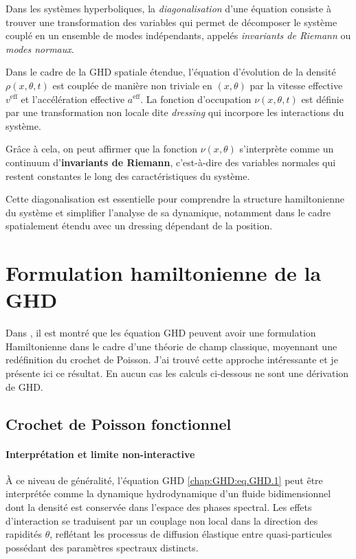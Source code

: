 \medskip

Dans les systèmes hyperboliques, la \emph{diagonalisation} d'une équation consiste à trouver une transformation des variables qui permet de décomposer le système couplé en un ensemble de modes indépendants, appelés \emph{invariants de Riemann} ou \emph{modes normaux}. 

\medskip

Dans le cadre de la \gls{GHD} spatiale étendue, l'équation d'évolution de la densité \(\rho(x,\theta,t)\) est couplée de manière non triviale en \((x,\theta)\) par la vitesse effective \(v^{\mathrm{eff}}\) et l'accélération effective \(a^{\mathrm{eff}}\). La fonction d'occupation \(\nu(x,\theta,t)\) est définie par une transformation non locale dite \emph{dressing} qui incorpore les interactions du système.

\medskip

Grâce à cela, on peut affirmer que la fonction $\nu (x , \theta)$  s’interprète comme un continuum d’{\bf invariants de Riemann}, c’est-à-dire des variables normales qui restent constantes le long des caractéristiques du système.

\medskip

Cette diagonalisation est essentielle pour comprendre la structure hamiltonienne du système et simplifier l'analyse de sa dynamique, notamment dans le cadre spatialement étendu avec un dressing dépendant de la position. 

\section{Formulation hamiltonienne de la GHD}

Dans  \cite{bonnemain2024hamiltonian}, il est montré que les équation \gls{GHD} peuvent
avoir une formulation Hamiltonienne dans le cadre d'une théorie de champ classique,
moyennant une redéfinition du crochet de Poisson. J'ai trouvé cette approche intéressante
et je présente ici ce résultat. En aucun cas les calculs ci-dessous ne sont une dérivation de \gls{GHD}.


\subsection{Crochet de Poisson fonctionnel}

\paragraph{Interprétation et limite non-interactive}  
À ce niveau de généralité, l'équation \gls{GHD} \eqref{chap:GHD:eq.GHD.1} peut être interprétée comme la dynamique hydrodynamique d’un fluide bidimensionnel dont la densité est conservée dans l’espace des phases spectral.  
Les effets d’interaction se traduisent par un couplage non local dans la direction des rapidités $\theta$, reflétant les processus de diffusion élastique entre quasi-particules possédant des paramètres spectraux distincts.

